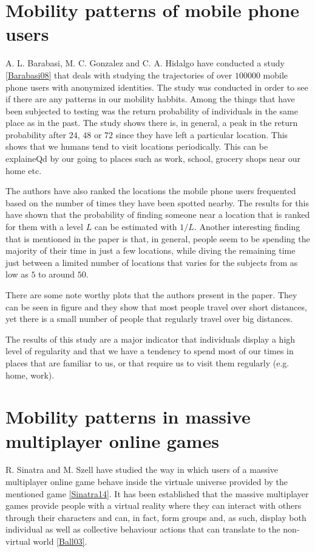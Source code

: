 \section{Mobility patterns of mobile phone users}
A. L. Barabasi, M. C. Gonzalez and C. A. Hidalgo have conducted a study
\ref{Barabasi08} that deals with studying the trajectories of over $100000$
mobile phone users with anonymized identities. The study was conducted in order
to see if there are any patterns in our mobility habbits. Among the things that
have been subjected to testing was the return probability of individuals in the
same place as in the past. The study shows there is, in general, a peak in the
return probability after $24$, $48$ or $72$ since they have left a particular
location. This shows that we humans tend to visit locations periodically. This
can be explaineQd by our going to places such as work, school, grocery shops
near our home etc.

The authors have also ranked the locations the mobile phone users frequented
based on the number of times they have been spotted nearby. The results for this
have shown that the probability of finding someone near a location that is
ranked for them with a level $L$ can be estimated with $1/L$. Another
interesting finding that is mentioned in the paper is that, in general, people
seem to be spending the majority of their time in just a few locations, while
diving the remaining time just between a limited number of locations that varies
for the subjects from as low as $5$ to around $50$.

There are some note worthy plots that the authors present in the paper. They can
be seen in figure{} and they show that most people travel over short distances,
yet there is a small number of people that regularly travel over big distances.

The results of this study are a major indicator that individuals display a high
level of regularity and that we have a tendency to spend most of our times in
places that are familiar to us, or that require us to visit them regularly
(e.g. home, work).

\section{Mobility patterns in massive multiplayer online games}
R. Sinatra and M. Szell have studied the way in which users of a massive
multiplayer online game behave inside the virtuale universe provided by the
mentioned game \ref{Sinatra14}. It has been established that the massive
multiplayer games provide people with a virtual reality where they can interact
with others through their characters and can, in fact, form groups and, as
such, display both individual as well as collective behaviour actions that can
translate to the non-virtual world \ref{Ball03}.

